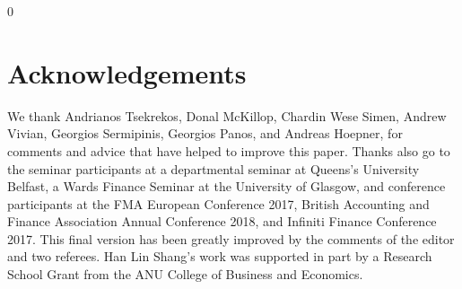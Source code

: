 \documentclass[12pt,a4paper]{article}
\newcommand{\blind}{0}
\begin{document}
\blind
{
\section*{Acknowledgements}

We thank Andrianos Tsekrekos, Donal McKillop, Chardin Wese Simen, Andrew Vivian, Georgios Sermipinis, Georgios Panos, and Andreas Hoepner, for comments and advice that have helped to improve this paper. Thanks also go to the seminar participants at a departmental seminar at Queens's University Belfast, a Wards Finance Seminar at the University of Glasgow, and conference participants at the FMA European Conference 2017, British Accounting and Finance Association Annual Conference 2018, and Infiniti Finance Conference 2017. This final version has been greatly improved by the comments of the editor and two referees. Han Lin Shang\textquoteright s work was supported in part by a Research School Grant from the ANU College of Business and Economics.
} \fi

\newpage


\end{document}
